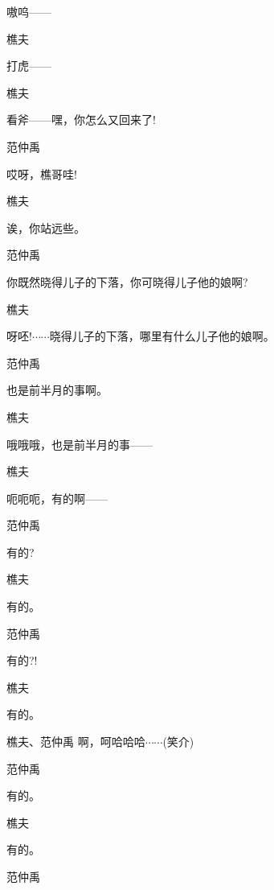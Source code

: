嗷呜------

{樵夫\hspace{30pt}~

打虎------}

{樵夫\hspace{30pt}~

看斧------嘿，你怎么又回来了!}

范仲禹\hspace{20pt}~

哎呀，樵哥哇!

{樵夫\hspace{30pt}~

诶，你站远些。}

范仲禹\hspace{20pt}~

你既然晓得儿子的下落，你可晓得儿子他的娘啊?

{樵夫

呀呸!$\cdots{}\cdots{}$晓得儿子的下落，哪里有什么儿子他的娘啊。}

范仲禹\hspace{20pt}~

也是前半月的事啊。

樵夫\hspace{30pt}~

哦哦哦，也是前半月的事------

樵夫\hspace{30pt}~

呃呃呃，有的啊------

范仲禹\hspace{20pt}~

有的?

樵夫\hspace{30pt}~

有的。

范仲禹\hspace{20pt}~

有的?!

樵夫\hspace{30pt}~

有的。

樵夫、范仲禹 啊，呵哈哈哈$\cdots{}\cdots{}$(笑介)

范仲禹\hspace{20pt}~

有的。

樵夫\hspace{30pt}~

有的。

范仲禹\hspace{20pt}~

